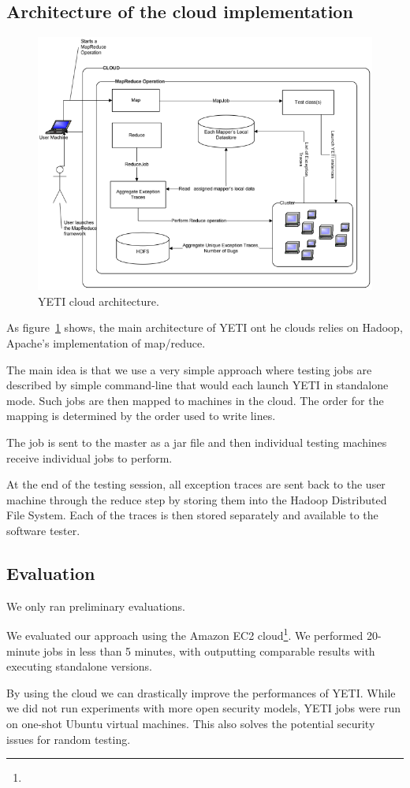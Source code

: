 \subsection{Architecture of the cloud implementation}
\begin{figure}[h]
\begin{center}
\includegraphics[width=14cm]{images/YetiCloud.png}
\end{center}
\caption{YETI cloud architecture.}\label{fig:architecture}
\end{figure}


As figure~\ref{fig:architecture} shows, the main architecture of YETI ont he clouds 
relies on Hadoop, Apache's implementation of map/reduce. 

The main idea is that we use a very simple approach where testing jobs 
are described by simple command-line that would each launch YETI in standalone mode. 
Such jobs are then mapped to machines in the cloud. The order for the mapping 
is determined by the order used to write lines. 

The job is sent to the master as a jar file and then individual testing machines 
receive individual jobs to perform.

At the end of the testing session, all exception traces are sent back to the 
user machine through the reduce step by storing them into the Hadoop Distributed File 
System. Each of the traces is then stored separately and available to the software 
tester.


\subsection{Evaluation}

We only ran preliminary evaluations.

We evaluated our approach using the Amazon EC2 cloud\footnote{}.
We performed 20-minute jobs in less than 5 minutes, with outputting 
comparable results with executing standalone versions.

By using the cloud we can drastically improve the performances of YETI.
While we did not run experiments with more open security models, 
YETI jobs were run on one-shot Ubuntu virtual machines. This also solves
the potential security issues for random testing.

